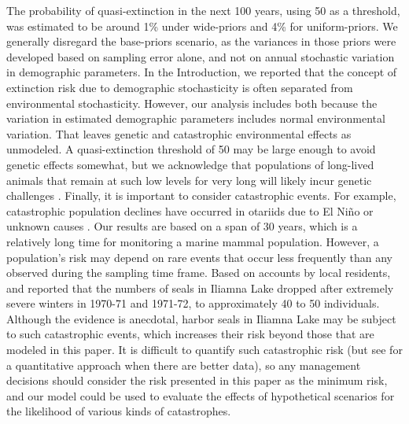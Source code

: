 \documentclass[]{risa}\usepackage[]{graphicx}\usepackage[]{color}
\begin{document}
The probability of quasi-extinction in the next 100 years, using 50 as a threshold, was estimated to be around 1\% under wide-priors and 4\% for uniform-priors. We generally disregard the base-priors scenario, as the variances in those priors were developed based on sampling error alone, and not on annual stochastic variation in demographic parameters. In the Introduction, we reported that the concept of extinction risk due to demographic stochasticity is often separated from environmental stochasticity.  However, our analysis includes both because the variation in estimated demographic parameters includes normal environmental variation.  That leaves genetic and catastrophic environmental effects as unmodeled.  A quasi-extinction threshold of 50 may be large enough to avoid genetic effects somewhat, but we acknowledge that populations of long-lived animals that remain at such low levels for very long will likely incur genetic challenges \citep{Fran:rela:1996}.  Finally, it is important to consider catastrophic events. For example, catastrophic population declines have occurred in otariids due to El Ni\~{n}o or unknown causes \citep{Gerb:Hilb:cata:2001}. Our results are based on a span of 30 years, which is a relatively long time for monitoring a marine mammal population. However, a population's risk may depend on rare events that occur less frequently than any observed during the sampling time frame. Based on accounts by local residents, \citet{Burn:unpu:1978} and \citet{Math:Klin:harb:1992} reported that the numbers of seals in Iliamna Lake dropped after extremely severe winters in 1970-71 and 1971-72, to approximately 40 to 50 individuals.  Although the evidence is anecdotal, harbor seals in Iliamna Lake may be subject to such catastrophic events, which increases their risk beyond those that are modeled in this paper.  It is difficult to quantify such catastrophic risk (but see \citet{Ward:Hilb:Towe:Gerb:stat:2007} for a quantitative approach when there are better data), so any management decisions should consider the risk presented in this paper as the minimum risk, and our model could be used to evaluate the effects of hypothetical scenarios for the likelihood of various kinds of catastrophes.
\end{document}
